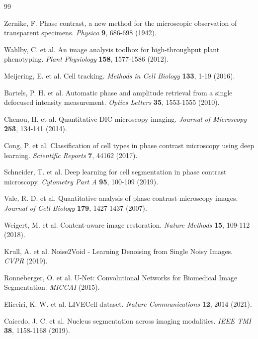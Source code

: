 \documentclass[10pt,twocolumn]{article}
\begin{document}
\begin{thebibliography}{99}

Zernike, F. Phase contrast, a new method for the microscopic observation of transparent specimens. \textit{Physica} \textbf{9}, 686-698 (1942).

Wahlby, C. et al. An image analysis toolbox for high-throughput plant phenotyping. \textit{Plant Physiology} \textbf{158}, 1577-1586 (2012).

Meijering, E. et al. Cell tracking. \textit{Methods in Cell Biology} \textbf{133}, 1-19 (2016).

Bartels, P. H. et al. Automatic phase and amplitude retrieval from a single defocused intensity measurement. \textit{Optics Letters} \textbf{35}, 1553-1555 (2010).

Chenou, H. et al. Quantitative DIC microscopy imaging. \textit{Journal of Microscopy} \textbf{253}, 134-141 (2014).

Cong, P. et al. Classification of cell types in phase contrast microscopy using deep learning. \textit{Scientific Reports} \textbf{7}, 44162 (2017).

Schneider, T. et al. Deep learning for cell segmentation in phase contrast microscopy. \textit{Cytometry Part A} \textbf{95}, 100-109 (2019).

Vale, R. D. et al. Quantitative analysis of phase contrast microscopy images. \textit{Journal of Cell Biology} \textbf{179}, 1427-1437 (2007).

Weigert, M. et al. Content-aware image restoration. \textit{Nature Methods} \textbf{15}, 109-112 (2018).

Krull, A. et al. Noise2Void - Learning Denoising from Single Noisy Images. \textit{CVPR} (2019).

Ronneberger, O. et al. U-Net: Convolutional Networks for Biomedical Image Segmentation. \textit{MICCAI} (2015).

Eliceiri, K. W. et al. LIVECell dataset. \textit{Nature Communications} \textbf{12}, 2014 (2021).

Caicedo, J. C. et al. Nucleus segmentation across imaging modalities. \textit{IEEE TMI} \textbf{38}, 1158-1168 (2019).

\end{thebibliography}
\end{document}
